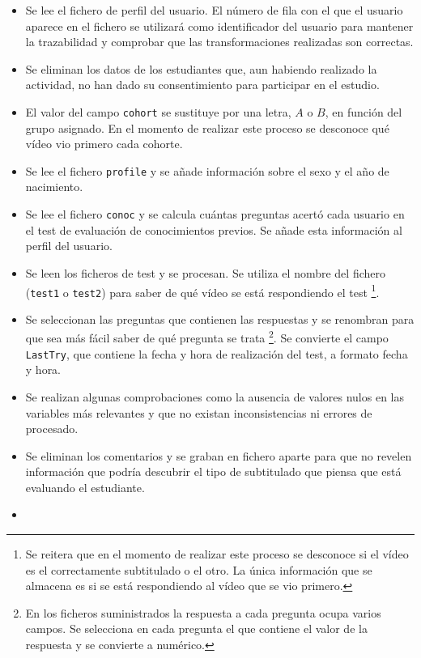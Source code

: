 \documentclass[
  12pt,
  a4paper,
  extrafontsizes,
  onecolumn,
  openright,
  table]{memoir}
\newlength{\rf}
\begin{document}
\begin{itemize}
\item
  Se lee el fichero de perfil del usuario. El número de fila con el que
  el usuario aparece en el fichero se utilizará como identificador del
  usuario para mantener la trazabilidad y comprobar que las
  transformaciones realizadas son correctas.
\item
  Se eliminan los datos de los estudiantes que, aun habiendo realizado
  la actividad, no han dado su consentimiento para participar en el
  estudio.
\item
  El valor del campo \texttt{cohort} se sustituye por una letra, \(A\) o
  \(B\), en función del grupo asignado. En el momento de realizar este
  proceso se desconoce qué vídeo vio primero cada cohorte.
\item
  Se lee el fichero \texttt{profile} y se añade información sobre el
  sexo y el año de nacimiento.
\item
  Se lee el fichero \texttt{conoc} y se calcula cuántas preguntas acertó
  cada usuario en el test de evaluación de conocimientos previos. Se
  añade esta información al perfil del usuario.
\item
  Se leen los ficheros de test y se procesan. Se utiliza el nombre del
  fichero (\texttt{test1} o \texttt{test2}) para saber de qué vídeo se
  está respondiendo el test \footnote{Se reitera que en el momento de
    realizar este proceso se desconoce si el vídeo es el correctamente
    subtitulado o el otro. La única información que se almacena es si se
    está respondiendo al vídeo que se vio primero.}.
\item
  Se seleccionan las preguntas que contienen las respuestas y se
  renombran para que sea más fácil saber de qué pregunta se trata
  \footnote{En los ficheros suministrados la respuesta a cada pregunta
    ocupa varios campos. Se selecciona en cada pregunta el que contiene
    el valor de la respuesta y se convierte a numérico.}. Se convierte
  el campo \texttt{LastTry}, que contiene la fecha y hora de realización
  del test, a formato fecha y hora.
\item
  Se realizan algunas comprobaciones como la ausencia de valores nulos
  en las variables más relevantes y que no existan inconsistencias ni
  errores de procesado.
\item
  Se eliminan los comentarios y se graban en fichero aparte para que no
  revelen información que podría descubrir el tipo de subtitulado que
  piensa que está evaluando el estudiante.
\item

\end{itemize}
\end{document}
